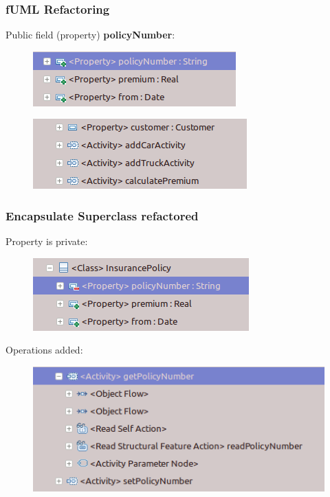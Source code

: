 \documentclass{beamer}
\begin{document}
        
\begin{frame}
\frametitle{fUML Refactoring}
Public field (property) \textbf{policyNumber}:
\begin{figure}
 \centering
 \includegraphics[scale=0.3]{images/fuml-refactorings/property-prerefactoring.png}
\end{figure}
\begin{figure}
 \centering
 \includegraphics[scale=0.3]{images/fuml-refactorings/activity-prerefactoring.png}
\end{figure}
\end{frame}

\begin{frame}
 \frametitle{Encapsulate Superclass refactored}
Property is private:
\begin{figure}
 \centering
 \includegraphics[scale=0.3]{images/fuml-refactorings/property-postrefactoring.png}
\end{figure}
Operations added:
\begin{figure}
 \centering
 \includegraphics[scale=0.3]{images/fuml-refactorings/getter-setter-treeview.png}
\end{figure}
\end{frame}
\end{document}
